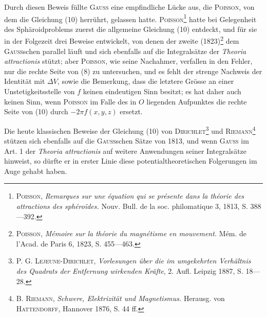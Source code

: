Durch diesen Beweis füllte \textsc{Gauss} eine empfindliche Lücke aus, die
\textsc{Poisson}, von dem die Gleichung (10) herrührt, gelassen hatte. \textsc{Poisson}\footnote{\textsc{Poisson}, \textit{Remarques sur une équation qui se présente dans la théorie des attractions des sphéroïdes.}
Nouv. Bull. de la soc. philomatique 3, 1813, S. 388—392.} hatte
\clearpage{}
\HistoricalFoot{}{6\textsuperscript{*}}
 bei Gelegenheit des Sphäroidproblems zuerst die allgemeine Gleichung
(10) entdeckt, und für sie in der Folgezeit drei Beweise entwickelt, von denen
der zweite (1823)\footnote{\textsc{Poisson}, \textit{Mémoire sur la théorie du magnétisme en mouvement.} Mém. de l’Acad. de Paris 6,
1823, S. 455—463.} dem \textsc{Gauss}schen parallel läuft und sich ebenfalls auf die
Integralsätze der \textit{Theoria attractionis} stützt; aber \textsc{Poisson}, wie seine Nachahmer,
verfallen in den Fehler, nur die rechte Seite von (8) zu untersuchen, und es
fehlt der strenge Nachweis der Identität mit \(\Delta V\), sowie die Bemerkung, dass
die letztere Grösse an einer Unstetigkeitsstelle von \(f\) keinen eindeutigen Sinn
besitzt; es hat daher auch keinen Sinn, wenn \textsc{Poisson} im Falle des in \(O\) liegenden
Aufpunktes die rechte Seite von (10) durch \(-2\pi f(x,y,z)\) ersetzt.

Die heute klassischen Beweise der Gleichung (10) von \textsc{Dirichlet}\footnote{\textsc{P. G. Lejeune-Dirichlet}, \textit{Vorlesungen über die im umgekehrten Verhältnis des Quadrats der
Entfernung wirkenden Kräfte}, 2. Aufl. Leipzig 1887, S. 18—28.} und
\textsc{Riemann}\footnote{\textsc{B. Riemann}, \textit{Schwere, Elektrizität und Magnetismus.} Herausg. von \textsc{Hattendorff}, Hannover
1876, S. 44 ff.} stützen sich ebenfalls auf die \textsc{Gauss}schen Sätze von 1813, und
wenn \textsc{Gauss} im Art. 1 der \textit{Theoria attractionis} auf weitere Anwendungen seiner
Integralsätze hinweist, so dürfte er in erster Linie diese potentialtheoretischen
Folgerungen im Auge gehabt haben.

